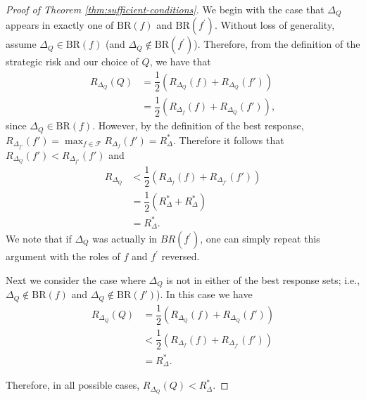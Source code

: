 \begin{proof}[Proof of Theorem \ref{thm:sufficient-conditions}]
    We begin with the case that $\Delta_Q$ appears in exactly one of $\text{BR}(f)$ and $\text{BR}(f^\prime)$. Without loss of generality, assume $\Delta_{Q} \in \text{BR}(f)$ (and $\Delta_{Q} \notin \text{BR}(f^\prime)$). Therefore, from the definition of the strategic risk and our choice of $Q$, we have that
    \begin{equation}
        \begin{split}
            R_{\Delta_{Q}}(Q) &= \dfrac{1}{2}(R_{\Delta_{Q}}(f) + R_{\Delta_{Q}}(f'))\\
            &= \dfrac{1}{2}(R_{\Delta_{f}}(f) + R_{\Delta_{Q}}(f')),
        \end{split}
    \end{equation}
    since $\Delta_{Q} \in \text{BR}(f)$. However, by the definition of the best response, $R_{\Delta_{f'}}(f') = \max_{f \in \mathcal{F}}R_{\Delta_{f}}(f') = R_{\Delta}^{\ast}$. Therefore it follows that $R_{\Delta_{Q}}(f') < R_{\Delta_{f'}}(f')$ and
    \begin{equation}
        \begin{split}
            R_{\Delta_{Q}} &< \dfrac{1}{2}(R_{\Delta_{f}}(f) + R_{\Delta_{f'}}(f'))\\
            &= \dfrac{1}{2}(R_{\Delta}^{\ast} + R_{\Delta}^{\ast})\\
            &= R_{\Delta}^{\ast}.
        \end{split}
    \end{equation}
    We note that if $\Delta_Q$ was actually in $BR(f^\prime)$, one can simply repeat this argument with the roles of $f$ and $f^\prime$ reversed.
        
    Next we consider the case where $\Delta_{Q}$ is not in either of the best response sets; i.e., $\Delta_{Q} \notin \text{BR}(f)$ and $\Delta_{Q} \notin \text{BR}(f')$). In this case we have
    \begin{equation}
        \begin{split}
            R_{\Delta_{Q}}(Q) &= \dfrac{1}{2}(R_{\Delta_{Q}}(f) + R_{\Delta_{Q}}(f'))\\
            &< \dfrac{1}{2}(R_{\Delta_{f}}(f) + R_{\Delta_{f'}}(f'))\\
            &= R_{\Delta}^{*}.
        \end{split}
    \end{equation}
    
    Therefore, in all possible cases, $R_{\Delta_{Q}}(Q)<R_{\Delta}^{\ast}$.
\end{proof}

